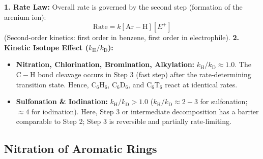 \documentclass[10pt,twoside,openright]{book}
\begin{document}
\begin{formulabox}
\textbf{1. Rate Law:} Overall rate is governed by the second step (formation of the arenium ion):
\begin{equation}
  \text{Rate} = k[\mathrm{Ar-H}][E^+]
\end{equation}
(Second-order kinetics: first order in benzene, first order in electrophile).
\textbf{2. Kinetic Isotope Effect ($k_{\mathrm{H}} / k_{\mathrm{D}}$):}
\begin{itemize}
  \item \textbf{Nitration, Chlorination, Bromination, Alkylation:} $k_{\mathrm{H}} / k_{\mathrm{D}} \approx 1.0$. The $\mathrm{C-H}$ bond cleavage occurs in Step 3 (fast step) after the rate-determining transition state. Hence, $\mathrm{C_6H_6}$, $\mathrm{C_6D_6}$, and $\mathrm{C_6T_6}$ react at identical rates.
  \item \textbf{Sulfonation \& Iodination:} $k_{\mathrm{H}} / k_{\mathrm{D}} > 1.0$ ($k_{\mathrm{H}}/k_{\mathrm{D}} \approx 2-3$ for sulfonation; $\approx 4$ for iodination). Here, Step 3 or intermediate decomposition has a barrier comparable to Step 2; Step 3 is reversible and partially rate-limiting.
\end{itemize}
\end{formulabox}

\subsection{Nitration of Aromatic Rings}
\end{document}
